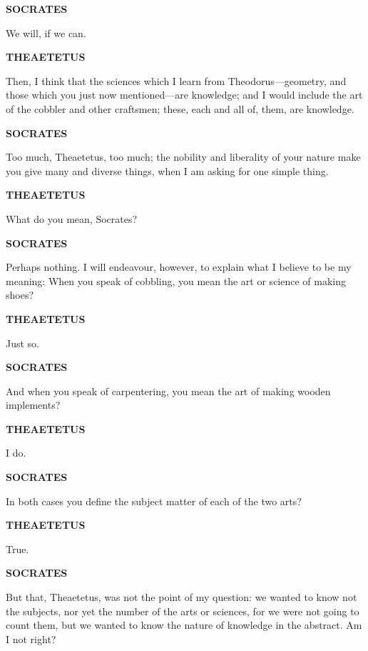 \documentclass[11pt,letter]{article}
\begin{document}
\par \textbf{SOCRATES}
\par   We will, if we can.

\par \textbf{THEAETETUS}
\par   Then, I think that the sciences which I learn from Theodorus—geometry, and those which you just now mentioned—are knowledge; and I would include the art of the cobbler and other craftsmen; these, each and all of, them, are knowledge.

\par \textbf{SOCRATES}
\par   Too much, Theaetetus, too much; the nobility and liberality of your nature make you give many and diverse things, when I am asking for one simple thing.

\par \textbf{THEAETETUS}
\par   What do you mean, Socrates?

\par \textbf{SOCRATES}
\par   Perhaps nothing. I will endeavour, however, to explain what I believe to be my meaning:  When you speak of cobbling, you mean the art or science of making shoes?

\par \textbf{THEAETETUS}
\par   Just so.

\par \textbf{SOCRATES}
\par   And when you speak of carpentering, you mean the art of making wooden implements?

\par \textbf{THEAETETUS}
\par   I do.

\par \textbf{SOCRATES}
\par   In both cases you define the subject matter of each of the two arts?

\par \textbf{THEAETETUS}
\par   True.

\par \textbf{SOCRATES}
\par   But that, Theaetetus, was not the point of my question:  we wanted to know not the subjects, nor yet the number of the arts or sciences, for we were not going to count them, but we wanted to know the nature of knowledge in the abstract. Am I not right?
\end{document}
